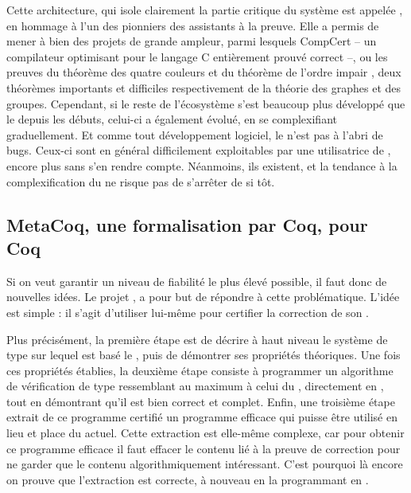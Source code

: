 Cette architecture, qui isole clairement la partie critique du système
est appelée  , en 
hommage à l’un des pionniers des assistants à la preuve.
Elle a permis de mener à bien des projets de grande ampleur, parmi lesquels CompCert  – un compilateur optimisant pour le langage C entièrement prouvé correct –, ou les preuves du théorème des quatre couleurs  et du théorème de l’ordre impair , deux théorèmes importants et difficiles respectivement de la théorie des graphes et des groupes.
Cependant, si le reste de l’écosystème s’est beaucoup plus développé que le  depuis les débuts, celui-ci a également évolué, en se complexifiant graduellement.
Et comme tout développement logiciel, le  n’est pas à l’abri de bugs.
Ceux-ci sont en général difficilement exploitables par une utilisatrice de , encore plus sans s’en rendre compte.
Néanmoins, ils existent, et la tendance à la complexification du  ne risque pas de s’arrêter de si tôt.

\subsection{MetaCoq, une formalisation par Coq, pour Coq}
\label{sec:intro-metacoq}


Si on veut garantir un niveau de fiabilité le plus élevé possible, il faut donc de nouvelles idées.
Le projet , a pour but de répondre à cette problématique.
L’idée est simple : il s’agit d’utiliser  lui-même pour certifier la correction de son .

Plus précisément, la première étape est de décrire à haut niveau le système de type sur lequel est basé le , puis de démontrer ses propriétés théoriques.
Une fois ces propriétés établies, la deuxième étape consiste à programmer un algorithme de vérification de type ressemblant au maximum à celui du , directement en ,
tout en démontrant qu’il est bien correct
et complet.
Enfin, une troisième étape extrait de ce programme  certifié
un programme efficace qui puisse être utilisé en lieu et place du  actuel.
Cette extraction est elle-même complexe, car pour obtenir ce programme efficace il
faut effacer le contenu lié à la preuve de correction
pour ne garder que le contenu algorithmiquement intéressant.
C’est pourquoi là encore on prouve que l’extraction est correcte,
à nouveau en la programmant en .

